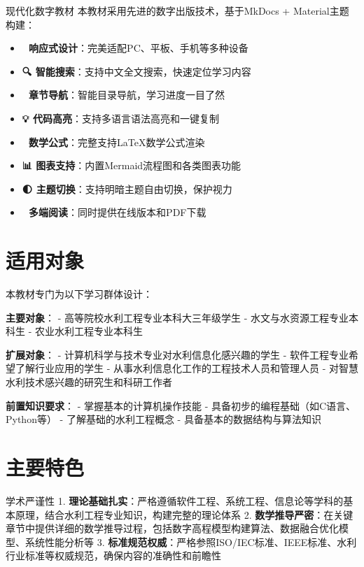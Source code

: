  现代化数字教材 本教材采用先进的数字出版技术，基于MkDocs + Material主题构建：

\begin{itemize}
\tightlist
\item
  \textbf{📱 响应式设计}：完美适配PC、平板、手机等多种设备
\item
  \textbf{🔍 智能搜索}：支持中文全文搜索，快速定位学习内容
\item
  \textbf{📑 章节导航}：智能目录导航，学习进度一目了然\\
\item
  \textbf{💡 代码高亮}：支持多语言语法高亮和一键复制
\item
  \textbf{🧮 数学公式}：完整支持LaTeX数学公式渲染
\item
  \textbf{📊 图表支持}：内置Mermaid流程图和各类图表功能
\item
  \textbf{🌓 主题切换}：支持明暗主题自由切换，保护视力
\item
  \textbf{📖 多端阅读}：同时提供在线版本和PDF下载
\end{itemize}

\section{适用对象}

本教材专门为以下学习群体设计：

\textbf{主要对象}： - 高等院校水利工程专业本科大三年级学生 - 水文与水资源工程专业本科生 - 农业水利工程专业本科生

\textbf{扩展对象}： - 计算机科学与技术专业对水利信息化感兴趣的学生 - 软件工程专业希望了解行业应用的学生 - 从事水利信息化工作的工程技术人员和管理人员 - 对智慧水利技术感兴趣的研究生和科研工作者

\textbf{前置知识要求}： - 掌握基本的计算机操作技能 - 具备初步的编程基础（如C语言、Python等） - 了解基础的水利工程概念 - 具备基本的数据结构与算法知识

\section{主要特色}

 学术严谨性 1. \textbf{理论基础扎实}：严格遵循软件工程、系统工程、信息论等学科的基本原理，结合水利工程专业知识，构建完整的理论体系 2. \textbf{数学推导严密}：在关键章节中提供详细的数学推导过程，包括数字高程模型构建算法、数据融合优化模型、系统性能分析等 3. \textbf{标准规范权威}：严格参照ISO/IEC标准、IEEE标准、水利行业标准等权威规范，确保内容的准确性和前瞻性

